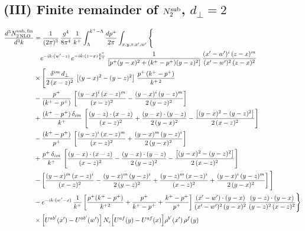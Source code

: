 \documentclass[10pt]{article}
\begin{document}
\subsection*{(III) Finite remainder of $N_{2}^{\rm sub}$, $d_{\perp}=2$}
\begin{align}
\frac{d^{3}N^{\rm sub,\,fin}_{2\,\rm NLO}}{d^{3}k}&=\frac{1}{(2\pi)^{3}}\,\frac{g^{4}}{8\pi^{4}}\,\frac{1}{k^{+}}\int_{\Lambda}^{k^{+}-\Lambda}\frac{dp^{+}}{2\pi}\int_{x,y,z,x',w'}\Bigg\{\notag\\&\quad e^{-ik\cdot(w'-z)}\,e^{-ik\cdot(z-x)\frac{p^{+}}{k^{+}}}\,\frac{1}{\left[p^{+}(y-x)^{2}+(k^{+}-p^{+})(y-z)^{2}\right]}\,\frac{(x'-w')^{i}\,(z-x)^{m}}{(x'-w')^{2}\,(z-x)^{2}}\notag\\
&\times\Bigg[\frac{\delta^{im}\,d_{\perp}}{2\,(x-z)^{2}}\,\left[(y-x)^{2}-(y-z)^{2}\right]\,\frac{p^{+}\,(k^{+}-p^{+})}{k^{+\,2}}\notag\\&-\frac{p^{+}}{(k^{+}-p^{+})}\,\left[\frac{(y-x)^{i}\,(x-z)^{m}}{(x-z)^{2}}-\frac{(y-x)^{i}\,(y-z)^{m}}{2\,(y-z)^{2}}\right]\notag\\
&+\frac{(k^{+}-p^{+})\,\delta_{im}}{k^{+}}\,\left[\frac{(y-z)\cdot (x-z)}{(x-z)^{2}}+\frac{(y-x)\cdot (y-z)}{2\,(y-x)^{2}}-\frac{\left[(y-x)^{2}-(y-z)^{2}\right]}{2\,(x-z)^{2}}\right]\notag\\
&-\frac{(k^{+}-p^{+})}{p^{+}}\,\left[\frac{(y-z)^{i}\,(x-z)^{m}}{(x-z)^{2}}+\frac{(y-x)^{m}\,(y-z)^{i}}{2\,(y-x)^{2}}\right]\notag\\
&+\frac{p^{+}\,\delta_{im}}{k^{+}}\,\left[\frac{(y-x)\cdot (x-z)}{(x-z)^{2}}-\frac{(y-x)\cdot (y-z)}{2\,(y-z)^{2}}-\frac{\left[(y-x)^{2}-(y-z)^{2}\right]}{2\,(x-z)^{2}}\right]\notag\\
&-\left[\frac{(y-x)^{m}\,(x-z)^{i}}{(x-z)^{2}}-\frac{(y-x)^{m}\,(y-z)^{i}}{2\,(y-z)^{2}}+\frac{(y-z)^{m}\,(x-z)^{i}}{(x-z)^{2}}+\frac{(y-x)^{i}\,(y-z)^{m}}{2\,(y-x)^{2}}\right]\Bigg]\notag\\
&-e^{-ik\cdot(w'-x)}\,\frac{1}{k^{+}}\left[\frac{p^{+}(k^{+}-p^{+})}{k^{+2}}+\frac{p^{+}}{k^{+}-p^{+}}+\frac{k^{+}-p^{+}}{p^{+}}\right]\frac{(x'-w')\cdot(y-x)}{(x'-w')^{2}\,(y-x)^{2}}\,\frac{(y-z)\cdot(y-x)}{(y-z)^{2}\,(x-z)^{2}}\Bigg\}\notag\\
&\times\Big[U^{ab'}(x')-U^{ab'}(w')\Big]\,N_{c}\Big[U^{af}(y)-U^{af}(x)\Big]\rho^{b'}(x')\,\rho^{f}(y)
\end{align}
\end{document}

